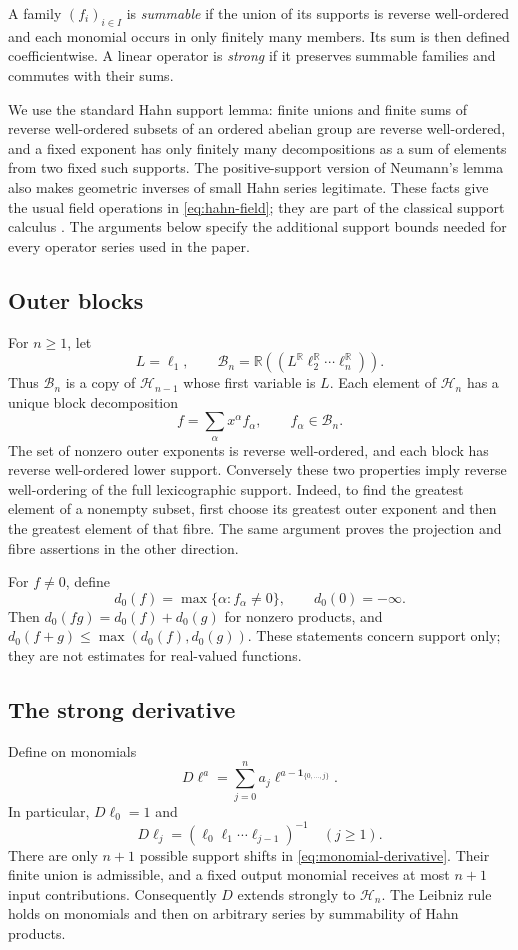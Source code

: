 \documentclass[11pt,a4paper]{article}
\numberwithin{equation}{section}
\theoremstyle{definition}
\theoremstyle{remark}
\newcommand{\R}{\mathbb R}
\newcommand{\HH}{\mathcal H}
\newcommand{\dprim}{d_0}
\begin{document}
A family $(f_i)_{i\in I}$ is \emph{summable} if the union of its supports is reverse well-ordered and each monomial occurs in only finitely many members. Its sum is then defined coefficientwise. A linear operator is \emph{strong} if it preserves summable families and commutes with their sums.

We use the standard Hahn support lemma: finite unions and finite sums of reverse well-ordered subsets of an ordered abelian group are reverse well-ordered, and a fixed exponent has only finitely many decompositions as a sum of elements from two fixed such supports. The positive-support version of Neumann's lemma also makes geometric inverses of small Hahn series legitimate. These facts give the usual field operations in \eqref{eq:hahn-field}; they are part of the classical support calculus \cite{vdh2001,vdh2006}. The arguments below specify the additional support bounds needed for every operator series used in the paper.

\subsection{Outer blocks}
For $n\ge1$, let
\[
 L=\ell_1,\qquad
 \mathcal B_n=\R((L^\R\ell_2^\R\cdots\ell_n^\R)).
\]
Thus $\mathcal B_n$ is a copy of $\HH_{n-1}$ whose first variable is $L$. Each element of $\HH_n$ has a unique block decomposition
\begin{equation}
 f=\sum_{\alpha}x^\alpha f_\alpha,\qquad f_\alpha\in\mathcal B_n.
 \label{eq:blocks}
\end{equation}
The set of nonzero outer exponents is reverse well-ordered, and each block has reverse well-ordered lower support. Conversely these two properties imply reverse well-ordering of the full lexicographic support. Indeed, to find the greatest element of a nonempty subset, first choose its greatest outer exponent and then the greatest element of that fibre. The same argument proves the projection and fibre assertions in the other direction.

For $f\ne0$, define
\[
 \dprim(f)=\max\{\alpha:f_\alpha\ne0\},\qquad \dprim(0)=-\infty.
\]
Then $\dprim(fg)=\dprim(f)+\dprim(g)$ for nonzero products, and $\dprim(f+g)\le\max(\dprim(f),\dprim(g))$. These statements concern support only; they are not estimates for real-valued functions.

\subsection{The strong derivative}
Define on monomials
\begin{equation}
 D\ell^a=\sum_{j=0}^{n}a_j\ell^{a-\mathbf1_{\{0,\ldots,j\}}}.
 \label{eq:monomial-derivative}
\end{equation}
In particular, $D\ell_0=1$ and
\[
 D\ell_j=(\ell_0\ell_1\cdots\ell_{j-1})^{-1}\quad(j\ge1).
\]
There are only $n+1$ possible support shifts in \eqref{eq:monomial-derivative}. Their finite union is admissible, and a fixed output monomial receives at most $n+1$ input contributions. Consequently $D$ extends strongly to $\HH_n$. The Leibniz rule holds on monomials and then on arbitrary series by summability of Hahn products.
\end{document}

